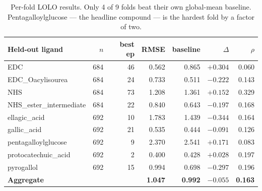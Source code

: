 \documentclass[11pt,a4paper]{article}
\newcommand{\ok}[1]{\textcolor{okgreen}{#1}}
\newcommand{\bad}[1]{\textcolor{badred}{#1}}
\begin{document}
\begin{table}[h]\centering
\small
\begin{tabular}{@{}lrrrrrr@{}}
\toprule
\textbf{Held-out ligand} & \textbf{$n$} & \textbf{best ep} & \textbf{RMSE} &
\textbf{baseline} & \textbf{$\Delta$} & \textbf{$\rho$} \\
\midrule
EDC                     & 684 & 46 & 0.562 & 0.865 & \ok{$+0.304$} & 0.060 \\
EDC\_Oacylisourea       & 684 & 24 & 0.733 & 0.511 & \bad{$-0.222$} & 0.143 \\
NHS                     & 684 & 73 & 1.208 & 1.361 & \ok{$+0.152$} & 0.329 \\
NHS\_ester\_intermediate& 684 & 22 & 0.840 & 0.643 & \bad{$-0.197$} & 0.168 \\
ellagic\_acid           & 692 & 10 & 1.783 & 1.439 & \bad{$-0.344$} & 0.164 \\
gallic\_acid            & 692 & 21 & 0.535 & 0.444 & \bad{$-0.091$} & 0.126 \\
pentagalloylglucose     & 692 &  9 & 2.370 & 2.541 & \ok{$+0.171$} & 0.083 \\
protocatechuic\_acid    & 692 &  2 & 0.400 & 0.428 & \ok{$+0.028$} & 0.197 \\
pyrogallol              & 692 & 15 & 0.994 & 0.698 & \bad{$-0.297$} & 0.196 \\
\midrule
\textbf{Aggregate}      &     &    & \textbf{1.047} & \textbf{0.992} & $-0.055$ & \textbf{0.163} \\
\bottomrule
\end{tabular}
\caption{Per-fold LOLO results. Only 4 of 9 folds beat their own
global-mean baseline. Pentagalloylglucose --- the headline compound --- is
the hardest fold by a factor of two.}
\end{table}
\end{document}
